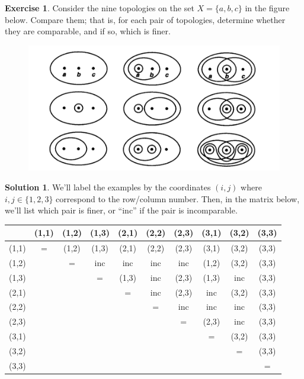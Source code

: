\documentclass[12pt]{article}
\theoremstyle{plain}
\theoremstyle{definition}
\newtheorem*{solution}{\color{Goldenrod}Solution}
\newtheorem{exercise}{\color{YellowOrange}Exercise}[section]
\newcommand{\1}{\mathbbm 1}
\begin{document}
\begin{exercise}
	Consider the nine topologies on the set $X = \{a,b,c\}$ in the figure below. Compare them; that is, for each pair of topologies, determine whether they are comparable, and if so, which is finer.
	\begin{figure}[H]
	\begin{center}
		\includegraphics[scale=.75]{top_ex.png}
	\end{center}
\end{figure}
\end{exercise}
\begin{solution}
	We'll label the examples by the coordinates $(i,j)$ where $i,j \in \{1,2,3\}$ correspond to the row/column number. Then, in the matrix below, we'll list which pair is finer, or ``inc'' if the pair is incomparable. 
	\begin{center}
	\begin{tabular}{ |c|c|c|c|c|c|c|c|c|c| } 	
		\hline
		& (1,1) & (1,2) & (1,3) & (2,1) & (2,2) & (2,3) & (3,1) & (3,2) & (3,3) \\	
		\hline
		(1,1) & = & (1,2) & (1,3) & (2,1) & (2,2) & (2,3) & (3,1) & (3,2) & (3,3) \\
		\hline 
		(1,2) & & = & inc & inc & inc & inc & (1,2) & (3,2) & (3,3) \\
		\hline
		(1,3) & & & = & (1,3) & inc & (2,3) & (1,3) & inc & (3,3) \\
		\hline
		(2,1) & & & & = & inc & (2,3) & inc & (3,2) & (3,3)\\
		\hline
		(2,2) & & & & & = & inc & inc & inc & (3,3) \\
		\hline
		(2,3) & & & & & & = & (2,3) & inc & (3,3) \\
		\hline
		(3,1) & & & & & & & = & (3,2) & (3,3) \\
		\hline
		(3,2) & & & & & & & & = & (3,3) \\
		\hline
		(3,3) & & & & & & & & & = \\ 
		\hline
	\end{tabular}
	\end{center}
\end{solution}
\end{document}
